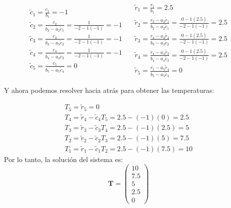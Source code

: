 \documentclass[11pt,a4paper]{article}
\begin{document}
\begin{equation}
\begin{array}{l}
\tilde{c}_1 = \frac{c_1}{b_1} = -1 \\
\tilde{c}_2 = \frac{c_2}{b_2 - a_2 \tilde{c}_1} = \frac{1}{-2 - 1(-1)} = -1 \\
\tilde{c}_3 = \frac{c_3}{b_3 - a_3 \tilde{c}_2} = \frac{1}{-2 - 1(-1)} = -1 \\
\tilde{c}_4 = \frac{c_4}{b_4 - a_4 \tilde{c}_3} = \frac{1}{-2 - 1(-1)} = -1 \\
\tilde{c}_5 = \frac{c_5}{b_5 - a_5 \tilde{c}_4} = 0
\end{array} \quad
\begin{array}{l}
\tilde{r}_1 = \frac{r_1}{b_1} = 2\textrm{.}5 \\
\tilde{r}_2 = \frac{r_2 - a_2 \tilde{r}_1}{b_2 - a_2 \tilde{c}_1} = \frac{0 - 1(2\textrm{.}5)}{-2 - 1(-1)} = 2\textrm{.}5 \\
\tilde{r}_3 = \frac{r_3 - a_3 \tilde{r}_2}{b_3 - a_3 \tilde{c}_2} = \frac{0 - 1(2\textrm{.}5)}{-2 - 1(-1)} = 2\textrm{.}5 \\
\tilde{r}_4 = \frac{r_4 - a_4 \tilde{r}_3}{b_4 - a_4 \tilde{c}_3} = \frac{0 - 1(2\textrm{.}5)}{-2 - 1(-1)} = 2\textrm{.}5 \\
\tilde{r}_5 = \frac{r_5 - a_5 \tilde{r}_4}{b_5 - a_5 \tilde{c}_4} = 0
\end{array}
\end{equation}

Y ahora podemos resolver hacia atr\'as para obtener las temperaturas:

\begin{equation}
\begin{array}{l}
T_5 = \tilde{r}_5 = 0 \\
T_4 = \tilde{r}_4 - \tilde{c}_4 T_5 = 2\textrm{.}5 - (-1)(0) = 2\textrm{.}5 \\
T_3 = \tilde{r}_3 - \tilde{c}_3 T_4 = 2\textrm{.}5 - (-1)(2\textrm{.}5) = 5 \\
T_2 = \tilde{r}_2 - \tilde{c}_2 T_3 = 2\textrm{.}5 - (-1)(5) = 7\textrm{.}5 \\
T_1 = \tilde{r}_1 - \tilde{c}_1 T_2 = 2\textrm{.}5 - (-1)(7\textrm{.}5) = 10
\end{array}
\end{equation}
Por lo tanto, la soluci\'on del sistema es:
\begin{equation}
\mathbf{T} = \begin{pmatrix}
10 \\
7\textrm{.}5 \\
5 \\
2\textrm{.}5 \\
0
\end{pmatrix}
\end{equation}
\end{document}
